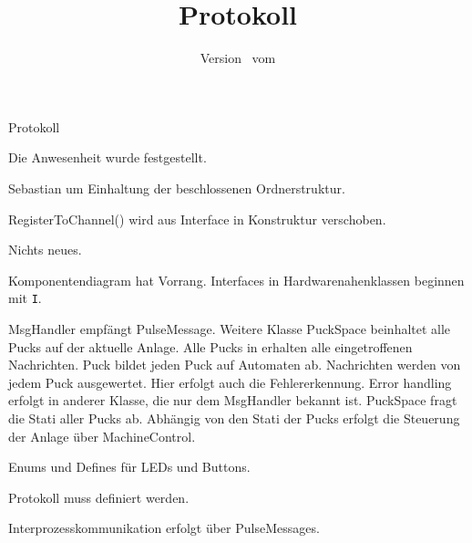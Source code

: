 \documentclass[a4paper, oneside]{scrreprt}
\begin{document}
    \title{Protokoll}
    \author{\vhListAllAuthors}
    \date{Version \vhCurrentVersion\ vom \vhCurrentDate}
    \maketitle

    \begin{versionhistory}
    \end{versionhistory}

    \begin{Minutes}{Protokoll}
        \maketitle

        Die Anwesenheit wurde festgestellt.

        Sebastian um Einhaltung der beschlossenen Ordnerstruktur. 


        RegisterToChannel() wird aus Interface in Konstruktur
        verschoben.

        Nichts neues.

        Komponentendiagram hat Vorrang. Interfaces in
        Hardwarenahenklassen beginnen mit \texttt{I}.

        MsgHandler empfängt PulseMessage. Weitere Klasse PuckSpace
        beinhaltet alle Pucks auf der aktuelle Anlage. Alle Pucks in
        erhalten alle eingetroffenen Nachrichten.
        Puck bildet jeden Puck auf Automaten ab. Nachrichten werden
        von jedem Puck ausgewertet. Hier erfolgt auch die
        Fehlererkennung. Error handling erfolgt in anderer Klasse, die
        nur dem MsgHandler bekannt ist. PuckSpace fragt die Stati aller
        Pucks ab.
        Abhängig von den Stati der Pucks erfolgt die Steuerung der
        Anlage über MachineControl.

        Enums und Defines für LEDs und Buttons.

        Protokoll muss definiert werden.

        Interprozesskommunikation erfolgt über PulseMessages.

    \end{Minutes}
\end{document}
